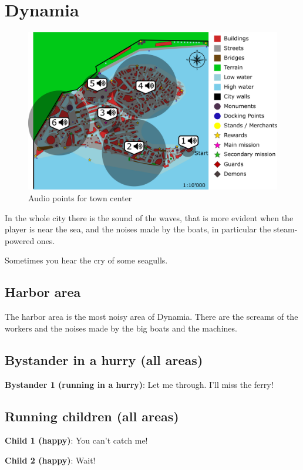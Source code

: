 \section{Dynamia}
\begin{figure}[H]
  \centering
  \includegraphics[width=\textwidth]{Images/Maps/dynamiaAudio}
  \caption{Audio points for town center}
\end{figure}

In the whole city there is the sound of the waves, that is more evident when the player is near the sea, and the noises made by the boats, in particular the steam-powered ones.

Sometimes you hear the cry of some seagulls.

\subsection{Harbor area}
The harbor area is the most noisy area of Dynamia. There are the screams of the workers and the noises made by the big boats and the machines.

\subsection{Bystander in a hurry (all areas)}
\textbf{Bystander 1 (running in a hurry)}: Let me through. I'll miss the ferry!

\subsection{Running children (all areas)}
\textbf{Child 1 (happy)}: You can't catch me!

\textbf{Child 2 (happy)}: Wait!

